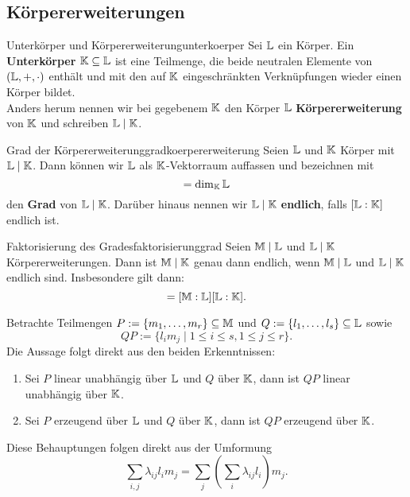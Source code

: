 \subsection{Körpererweiterungen}
\label{subsec:koerpererweiterungen}
\begin{definition}{Unterkörper und Körpererweiterung}{unterkoerper}
Sei $\mathbb{L}$ ein Körper. Ein \textbf{Unterkörper} $\mathbb{K} \subseteq \mathbb{L}$ ist eine Teilmenge, die beide neutralen Elemente von $(\mathbb{L}, +, \cdot)$ enthält und mit den auf $\mathbb{K}$ eingeschränkten Verknüpfungen wieder einen Körper bildet.\\
Anders herum nennen wir bei gegebenem $\mathbb{K}$ den Körper $\mathbb{L}$ \textbf{Körpererweiterung} von $\mathbb{K}$ und schreiben $\mathbb{L} \mid \mathbb{K}$.
\end{definition}
\begin{definition}{Grad der Körpererweiterung}{gradkoerpererweiterung}
Seien $\mathbb{L}$ und $\mathbb{K}$ Körper mit $\mathbb{L} \mid \mathbb{K}$. Dann können wir $\mathbb{L}$ als $\mathbb{K}$-Vektorraum auffassen und bezeichnen mit
\begin{equation}
[\L : \K] = \dim_\K \L
\end{equation}
den \textbf{Grad} von $\mathbb{L} \mid \mathbb{K}$. Darüber hinaus nennen wir $\mathbb{L} \mid \mathbb{K}$ \textbf{endlich}, falls $[\mathbb{L} : \mathbb{K}]$ endlich ist.
\end{definition}
\begin{lemma}{Faktorisierung des Grades}{faktorisierunggrad}
Seien $\mathbb{M} \mid \mathbb{L}$ und $\mathbb{L} \mid \mathbb{K}$ Körpererweiterungen. Dann ist $\mathbb{M} \mid \mathbb{K}$ genau dann endlich, wenn $\mathbb{M} \mid \mathbb{L}$ und $\mathbb{L} \mid \mathbb{K}$ endlich sind. Insbesondere gilt dann:
\begin{equation}
[\M : \K] = [\M : \L][\L : \K].
\end{equation}
\end{lemma}
\begin{beweis}
Betrachte Teilmengen $P:= \{m_1, \dots, m_r\} \subseteq \mathbb{M}$ und $Q:=\{l_1, \dots, l_s\} \subseteq \mathbb{L}$ sowie
\begin{equation}
QP:=\{l_im_j \mid 1 \leq i \leq s, 1 \leq j \leq r\}.
\end{equation}
Die Aussage folgt direkt aus den beiden Erkenntnissen:
\begin{enumerate}
\item Sei $P$ linear unabhängig über $\mathbb{L}$ und $Q$ über $\mathbb{K}$, dann ist $QP$ linear unabhängig über $\mathbb{K}$.
\item Sei $P$ erzeugend über $\mathbb{L}$ und $Q$ über $\mathbb{K}$, dann ist $QP$ erzeugend über $\mathbb{K}$.
\end{enumerate}
Diese Behauptungen folgen direkt aus der Umformung
\begin{equation}
\sum_{i,j} \lambda_{ij} l_im_j = \sum_j \left( \sum_i \lambda_{ij} l_i \right) m_j.
\end{equation}
\end{beweis}
